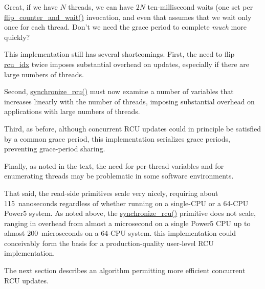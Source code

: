 \QuickQuiz{}
	Great, if we have $N$ threads, we can have $2N$ ten-millisecond
	waits (one set per \url{flip_counter_and_wait()} invocation,
	and even that assumes that we wait only once for each thread.
	Don't we need the grace period to complete \emph{much} more quickly?
 \QuickQuizEnd

This implementation still has several shortcomings.
First, the need to flip \url{rcu_idx} twice imposes substantial overhead
on updates, especially if there are large numbers of threads.

Second, \url{synchronize_rcu()} must now examine a number of variables
that increases linearly with the number of threads, imposing substantial
overhead on applications with large numbers of threads.

Third, as before, although concurrent RCU updates could in principle
be satisfied by a common grace period, this implementation serializes
grace periods, preventing grace-period sharing.

Finally, as noted in the text, the need for per-thread variables
and for enumerating threads may be problematic in some software
environments.

That said, the read-side primitives scale very nicely, requiring about
115~nanoseconds regardless of whether running on a single-CPU or a 64-CPU
Power5 system.
As noted above, the \url{synchronize_rcu()} primitive does not scale,
ranging in overhead from almost a microsecond on a single Power5 CPU
up to almost 200~microseconds on a 64-CPU system.
this implementation could conceivably form the basis for a
production-quality user-level RCU implementation.

The next section describes an algorithm permitting more efficient
concurrent RCU updates.

